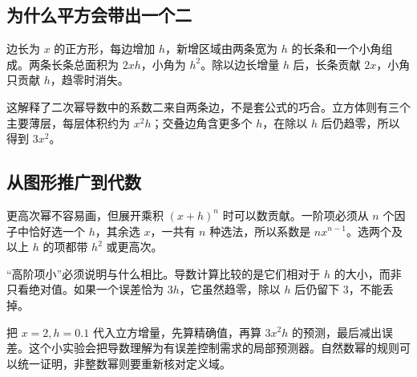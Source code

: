 \subsection*{为什么平方会带出一个二}
边长为 $x$ 的正方形，每边增加 $h$，新增区域由两条宽为 $h$ 的长条和一个小角组成。两条长条总面积为 $2xh$，小角为 $h^2$。除以边长增量 $h$ 后，长条贡献 $2x$，小角只贡献 $h$，趋零时消失。

这解释了二次幂导数中的系数二来自两条边，不是套公式的巧合。立方体则有三个主要薄层，每层体积约为 $x^2h$；交叠边角含更多个 $h$，在除以 $h$ 后仍趋零，所以得到 $3x^2$。

\subsection*{从图形推广到代数}
更高次幂不容易画，但展开乘积 $(x+h)^n$ 时可以数贡献。一阶项必须从 $n$ 个因子中恰好选一个 $h$，其余选 $x$，一共有 $n$ 种选法，所以系数是 $nx^{n-1}$。选两个及以上 $h$ 的项都带 $h^2$ 或更高次。

“高阶项小”必须说明与什么相比。导数计算比较的是它们相对于 $h$ 的大小，而非只看绝对值。如果一个误差恰为 $3h$，它虽然趋零，除以 $h$ 后仍留下 $3$，不能丢掉。

把 $x=2,h=0.1$ 代入立方增量，先算精确值，再算 $3x^2h$ 的预测，最后减出误差。这个小实验会把导数理解为有误差控制需求的局部预测器。自然数幂的规则可以统一证明，非整数幂则要重新核对定义域。
